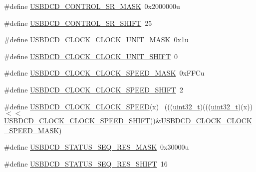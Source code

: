 \begin{DoxyCompactItemize}
\#define \hyperlink{group___u_s_b_d_c_d___register___masks_ga7455215193ec55d79026af2e09a7523f}{U\+S\+B\+D\+C\+D\+\_\+\+C\+O\+N\+T\+R\+O\+L\+\_\+\+S\+R\+\_\+\+M\+A\+SK}~0x2000000u
\item 
\#define \hyperlink{group___u_s_b_d_c_d___register___masks_ga122056290d48016111c0a5e3cb8b63c4}{U\+S\+B\+D\+C\+D\+\_\+\+C\+O\+N\+T\+R\+O\+L\+\_\+\+S\+R\+\_\+\+S\+H\+I\+FT}~25
\item 
\#define \hyperlink{group___u_s_b_d_c_d___register___masks_ga7c8eace6dde39098426fe04c6b32bf92}{U\+S\+B\+D\+C\+D\+\_\+\+C\+L\+O\+C\+K\+\_\+\+C\+L\+O\+C\+K\+\_\+\+U\+N\+I\+T\+\_\+\+M\+A\+SK}~0x1u
\item 
\#define \hyperlink{group___u_s_b_d_c_d___register___masks_gae3126a9608c08fe560b91f7b742bb98a}{U\+S\+B\+D\+C\+D\+\_\+\+C\+L\+O\+C\+K\+\_\+\+C\+L\+O\+C\+K\+\_\+\+U\+N\+I\+T\+\_\+\+S\+H\+I\+FT}~0
\item 
\#define \hyperlink{group___u_s_b_d_c_d___register___masks_gaf53eaecf9a4de0251c8906350ac989ae}{U\+S\+B\+D\+C\+D\+\_\+\+C\+L\+O\+C\+K\+\_\+\+C\+L\+O\+C\+K\+\_\+\+S\+P\+E\+E\+D\+\_\+\+M\+A\+SK}~0x\+F\+F\+Cu
\item 
\#define \hyperlink{group___u_s_b_d_c_d___register___masks_gaa1667808247c5b8355c58b93a4e80c8a}{U\+S\+B\+D\+C\+D\+\_\+\+C\+L\+O\+C\+K\+\_\+\+C\+L\+O\+C\+K\+\_\+\+S\+P\+E\+E\+D\+\_\+\+S\+H\+I\+FT}~2
\item 
\#define \hyperlink{group___u_s_b_d_c_d___register___masks_gab612fd6bc4a6d4ebb440f33c4f0561b7}{U\+S\+B\+D\+C\+D\+\_\+\+C\+L\+O\+C\+K\+\_\+\+C\+L\+O\+C\+K\+\_\+\+S\+P\+E\+ED}(x)                        ~(((\hyperlink{_p_e___types_8h_a33594304e786b158f3fb30289278f5af}{uint32\+\_\+t})(((\hyperlink{_p_e___types_8h_a33594304e786b158f3fb30289278f5af}{uint32\+\_\+t})(x))$<$$<$\hyperlink{group___u_s_b_d_c_d___register___masks_gaa1667808247c5b8355c58b93a4e80c8a}{U\+S\+B\+D\+C\+D\+\_\+\+C\+L\+O\+C\+K\+\_\+\+C\+L\+O\+C\+K\+\_\+\+S\+P\+E\+E\+D\+\_\+\+S\+H\+I\+FT}))\&\hyperlink{group___u_s_b_d_c_d___register___masks_gaf53eaecf9a4de0251c8906350ac989ae}{U\+S\+B\+D\+C\+D\+\_\+\+C\+L\+O\+C\+K\+\_\+\+C\+L\+O\+C\+K\+\_\+\+S\+P\+E\+E\+D\+\_\+\+M\+A\+SK})
\item 
\#define \hyperlink{group___u_s_b_d_c_d___register___masks_gaa1c55980f5e31bfe02a2f4bc3bcf753d}{U\+S\+B\+D\+C\+D\+\_\+\+S\+T\+A\+T\+U\+S\+\_\+\+S\+E\+Q\+\_\+\+R\+E\+S\+\_\+\+M\+A\+SK}~0x30000u
\item 
\#define \hyperlink{group___u_s_b_d_c_d___register___masks_ga4d1d707ac9f9afb0b114a4032951971d}{U\+S\+B\+D\+C\+D\+\_\+\+S\+T\+A\+T\+U\+S\+\_\+\+S\+E\+Q\+\_\+\+R\+E\+S\+\_\+\+S\+H\+I\+FT}~16
$$
\end{DoxyCompactItemize}
